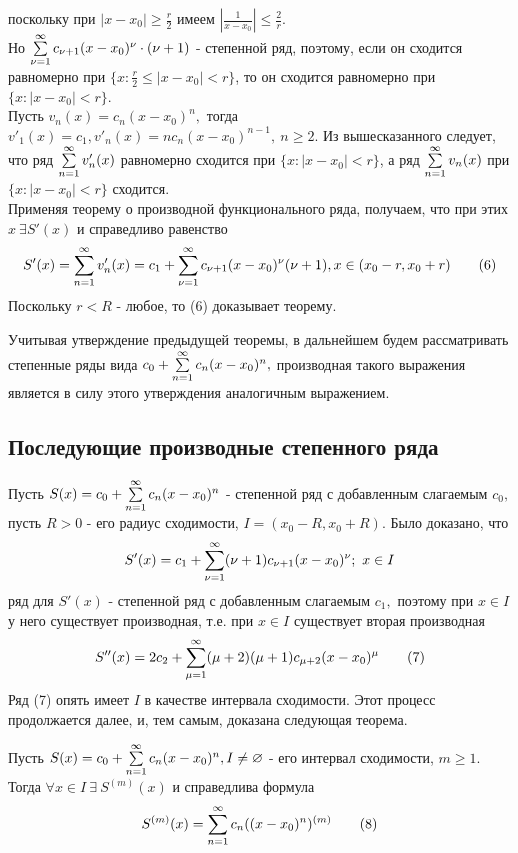 \documentclass[main]{subfiles}
\begin{document}
\begin{longProof}
   поскольку при $|x-x_0|\geq\frac{r}{2}$ имеем $|\frac{1}{x-x_0}|\leq\frac{2}{r}.$\\ 
 Но $\su[\nu=1] c_{\nu+1}(x-x_0)^\nu\cdot(\nu+1)$ - степенной ряд, поэтому, если он сходится равномерно при $\{ x: \frac{r}{2}\leq|x-x_0|< r\}$,
 то он сходится равномерно при $\{ x: |x-x_0|< r\}$.\\
Пусть $v_n(x)=c_n(x-x_0)^n,$ тогда $v'_1(x)=c_1, v'_n(x)=nc_n(x-x_0)^{n-1},\ n\geq 2.$ Из вышесказанного следует, что ряд $\su v_n'(x)$ равномерно сходится при $\{ x: |x-x_0|< r\}$,
 а ряд $\su v_n(x)$ при $\{ x: |x-x_0|< r\}$ сходится.\\
Применяя теорему о производной функционального ряда, получаем, что при этих $x\ \exists S'(x)$ и справедливо равенство 
\[ S'(x)=\su v_n'(x)=c_1+\su[\nu=1]c_{\nu+1}(x-x_0)^{\nu}(\nu+1), x\in (x_0-r, x_0+r)\tag{6} \]
Поскольку $r<R$ - любое, то (6) доказывает теорему.
\end{longProof}
Учитывая утверждение предыдущей теоремы, в дальнейшем будем рассматривать степенные ряды вида $c_0+\su c_n(x-x_0)^n,$ производная 
такого выражения является в силу этого утверждения аналогичным выражением.
\subsection{Последующие производные степенного ряда}
Пусть $S(x)=c_0+\su c_n(x-x_0)^n$ - степенной ряд с добавленным слагаемым $c_0,$ пусть $R>0$ - его радиус сходимости,
 $I=(x_0-R,x_0+R)$. Было доказано, что \[ S'(x)=c_1+\su[\nu=1](\nu+1)c_{\nu+1}(x-x_0)^\nu;\ x\in I \]
ряд для $S'(x)$ - степенной ряд с добавленным слагаемым $c_1,$ поэтому при $x\in I$ у него существует производная,
 т.е. при $x\in I$ существует вторая производная \[ S''(x)=2c_2+\su[\mu=1](\mu+2)(\mu+1)c_{\mu+2}(x-x_0)^\mu\tag{7} \]
Ряд (7) опять имеет $I$ в качестве интервала сходимости. Этот процесс продолжается далее, и, тем самым, доказана следующая теорема.\\
\begin{theorem} Пусть $S(x)=c_0+\su c_n(x-x_0)^n, I\ne\varnothing$ - его интервал сходимости, $m\geq 1.$\\
Тогда $\forall x\in I\ \exists\ S^{(m)}(x)$ и справедлива формула
\[ S^{(m)}(x)=\su c_n((x-x_0)^n)^{(m)}\tag{8} \]
\end{theorem}
\end{document}
